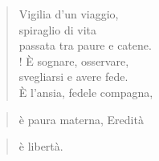 
\begin{verse}
Vigilia d'un viaggio,\\
spiraglio di vita\\
passata tra paure e catene.\\!
È sognare, osservare,\\
svegliarsi e avere fede.\\
È l'ansia, fedele compagna,\\
\end{verse}

\vspace{-0.9cm}
\begin{verse}è paura materna, \hfill Eredità \end{verse}
\vspace{-0.9cm}

\begin{verse}
è libertà.
\end{verse}